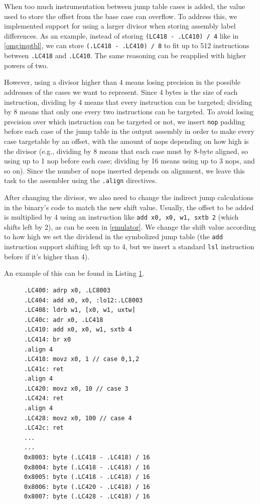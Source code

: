 \documentclass[a4paper,11pt,oneside]{report}
\begin{document}
When too much instrumentation between jump table cases is added, the value used
to store the offset from the base case can overflow. To address this, we
implemented support for using a larger divisor when storing assembly label
differences.  As an example, instead of storing \texttt{(LC418 - .LC410) / 4}
like in \autoref{omgjmptbl}, we can store \texttt{(.LC418 - .LC410) / 8} to fit
up to 512 instructions between \texttt{.LC418} and \texttt{.LC410}. The same reasoning
can be reapplied with higher powers of two. 

However, using a divisor higher than 4 means losing precision in the possible
addresses of the cases we want to represent. Since 4 bytes is the size of each
instruction, dividing by 4 means that every instruction can be targeted;
dividing by 8 means that only one every two instructions can be targeted. To
avoid losing precision over which instruction can be targeted or not, we insert
\texttt{nop} padding before each case of the jump table in the output assembly
in order to make every case targetable by an offset, with the amount of nops
depending on how high is the divisor (e.g., dividing by 8 means that each case
must by 8-byte aligned, so using up to 1 nop before each case; dividing by 16
means using up to 3 nops, and so on). Since the number of nops inserted depends on 
alignment, we leave this task to the assembler using the \texttt{.align} directives.

After changing the divisor, we also need to change the indirect jump calculations in the
binary's code to match the new shift value. Usually, the offset to be added is multiplied by
4 using an instruction like \texttt{add x0, x0, w1, sxtb 2} (which shifts left by 2), as
can be seen in \autoref{emulator}. We change the shift value according to how high we set
the dividend in the symbolized jump table (the \texttt{add} instruction support shifting left
up to 4, but we insert a standard \texttt{lsl} instruction before if it's higher than 4). 

An example of this can be found in Listing \ref{enlarged}.

\begin{figure}[h]
\begin{lstlisting}[basicstyle=\ttfamily\small,numbers=none]
.LC400: adrp x0, .LC8003
.LC404: add x0, x0, :lo12:.LC8003
.LC408: ldrb w1, [x0, w1, uxtw]
.LC40c: adr x0, .LC418
.LC410: add x0, x0, w1, sxtb 4
.LC414: br x0
.align 4
.LC418: movz x0, 1 // case 0,1,2
.LC41c: ret
.align 4
.LC420: movz x0, 10 // case 3
.LC424: ret
.align 4
.LC428: movz x0, 100 // case 4
.LC42c: ret
...
...
0x8003: byte (.LC418 - .LC418) / 16
0x8004: byte (.LC418 - .LC418) / 16
0x8005: byte (.LC418 - .LC418) / 16
0x8006: byte (.LC420 - .LC418) / 16
0x8007: byte (.LC428 - .LC418) / 16
\end{lstlisting}
\label{enlarged}
\end{figure}
\end{document}
